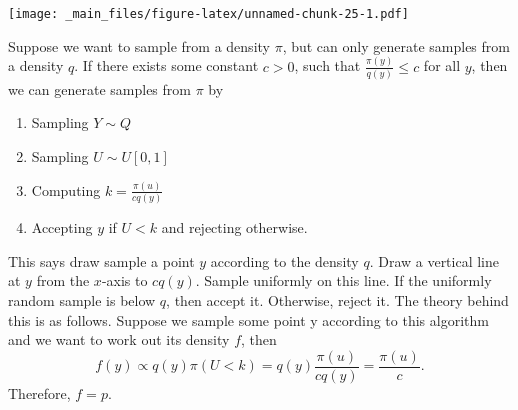 \documentclass[
]{book}
\theoremstyle{definition}
\theoremstyle{definition}
\theoremstyle{definition}
\theoremstyle{definition}
\theoremstyle{remark}
\begin{document}
\texttt{[image: \_main\_files/figure-latex/unnamed-chunk-25-1.pdf]}

Suppose we want to sample from a density \(\pi\), but can only generate samples from a density \(q\). If there exists some constant \(c > 0\), such that \(\frac{\pi(y)}{q(y)} \leq c\) for all \(y\), then we can generate samples from \(\pi\) by

\begin{enumerate}
\def\labelenumi{\arabic{enumi}.}
\item
  Sampling \(Y \sim Q\)
\item
  Sampling \(U \sim U[0, 1]\)
\item
  Computing \(k = \frac{\pi(u)}{cq(y)}\)
\item
  Accepting \(y\) if \(U < k\) and rejecting otherwise.
\end{enumerate}

This says draw sample a point \(y\) according to the density \(q\). Draw a vertical line at \(y\) from the \(x\)-axis to \(cq(y)\). Sample uniformly on this line. If the uniformly random sample is below \(q\), then accept it. Otherwise, reject it. The theory behind this is as follows. Suppose we sample some point y according to this algorithm and we want to work out its density \(f\), then
\[
f(y) \propto q(y)\pi(U < k) = q(y)\frac{\pi(u)}{cq(y)} = \frac{\pi(u)}{c}.
\]
Therefore, \(f = p\).
\end{document}
